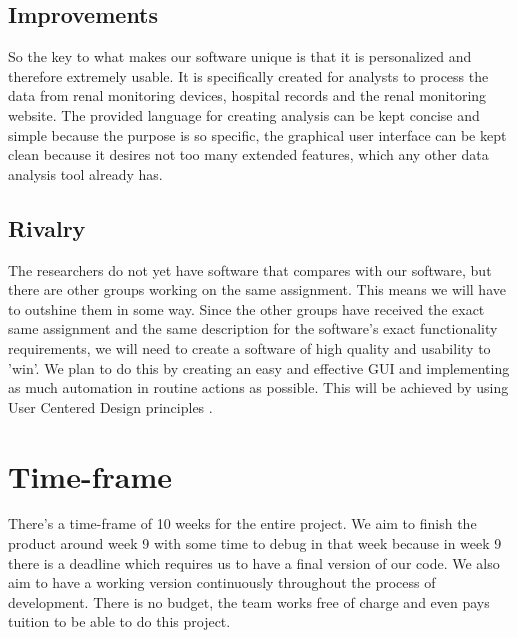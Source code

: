 \documentclass[a4paper]{article}
\begin{document}
\subsection{Improvements}
So the key to what makes our software unique is that it is personalized and therefore extremely usable. It is specifically created for analysts to process the data from renal monitoring devices, hospital records and the renal monitoring website. The provided language for creating analysis can be kept concise and simple because the purpose is so specific, the graphical user interface can be kept clean because it desires not too many extended features, which any other data analysis tool already has.

\subsection{Rivalry}
The researchers do not yet have software that compares with our software, but there are other groups working on the same assignment. This means we will have to outshine them in some way. Since the other groups have received the exact same assignment and the same description for the software's exact functionality requirements, we will need to create a software of high quality and usability to 'win'. We plan to do this by creating an easy and effective GUI and implementing as much automation in routine actions as possible. This will be achieved by using User Centered Design principles \cite{Nielsen}.

\section{Time-frame}
There's a time-frame of 10 weeks for the entire project. We aim to finish the product around week 9 with some time to debug in that week because in week 9 there is a deadline which requires us to have a final version of our code. We also aim to have a working version continuously throughout the process of development. There is no budget, the team works free of charge and even pays tuition to be able to do this project.



\end{document}

